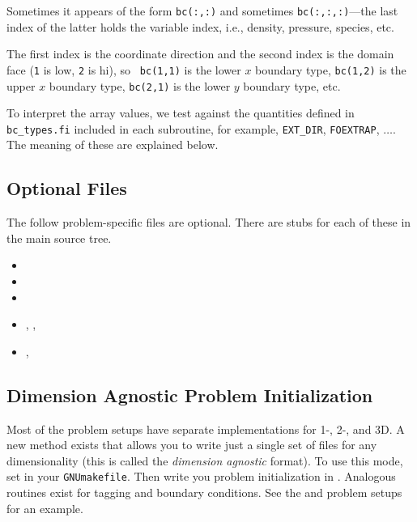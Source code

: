 \begin{itemize}
\begin{itemize}
    Sometimes it appears of the form {\tt bc(:,:)} and sometimes
    {\tt bc(:,:,:)}---the last index of the latter holds the variable
    index, i.e., density, pressure, species, etc.

    The first index is the coordinate direction and the second index
    is the domain face ({\tt 1} is low, {\tt 2} is hi), so {\tt
    bc(1,1)} is the lower $x$ boundary type, {\tt bc(1,2)} is
    the upper $x$ boundary type, {\tt bc(2,1)} is the lower
    $y$ boundary type, etc.

    To interpret the array values, we test against the quantities
    defined in {\tt bc\_types.fi} included in each subroutine,
    for example, {\tt EXT\_DIR}, {\tt FOEXTRAP}, $\ldots$.  The
    meaning of these are explained below.

  \end{itemize}

\end{itemize}


\subsection{Optional Files}

The follow problem-specific files are optional.  There are stubs for
each of these in the main source tree.  

\begin{itemize}

\item {}

\item {}

\item {}

\item {}, , 

\item {}, 

\end{itemize}



\subsection{Dimension Agnostic Problem Initialization}

Most of the problem setups have separate implementations for 1-, 2-,
and 3D.  A new method exists that allows you to write just a single
set of files for any dimensionality (this is called the {\em dimension
  agnostic} format).  To use this mode, set
 in your {\tt GNUmakefile}.
Then write you problem initialization in .
Analogous routines exist for tagging and boundary conditions.  See the
 and  problem setups for an
example.

